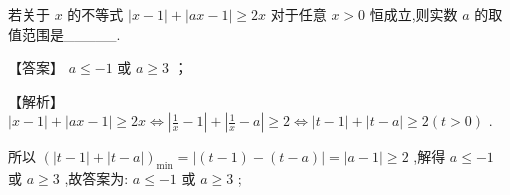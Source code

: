 \documentclass[11pt,a4paper]{article}
\begin{document}
\begin{problem} 
若关于 \(\displaystyle x\) 的不等式 \(\displaystyle \left| {x - 1}\right|  + \left| {{ax} - 1}\right|  \geq  {2x}\) 对于任意 \(\displaystyle x > 0\) 恒成立,则实数 \(\displaystyle a\) 的取值范围是\_\_\_\_\_.
\begin{jiexi}
【答案】 \(\displaystyle a \leq   - 1\) 或 \(\displaystyle a \geq  3\) ；

【解析】 \(\displaystyle \left| {x - 1}\right|  + \left| {{ax} - 1}\right|  \geq  {2x} \Leftrightarrow  \left| {\frac{1}{x} - 1}\right|  + \left| {\frac{1}{x} - a}\right|  \geq  2 \Leftrightarrow  \left| {t - 1}\right|  + \left| {t - a}\right|  \geq  2\left( {t > 0}\right)\) .

所以 \(\displaystyle {\left( \left| t - 1\right|  + \left| t - a\right| \right) }_{\min } = \left| {\left( {t - 1}\right)  - \left( {t - a}\right) }\right|  = \left| {a - 1}\right|  \geq  2\) ,解得 \(\displaystyle a \leq   - 1\) 或 \(\displaystyle a \geq  3\) ,故答案为: \(\displaystyle a \leq   - 1\) 或 \(\displaystyle a \geq  3\) ;


\end{jiexi}
\end{problem}
\end{document}
